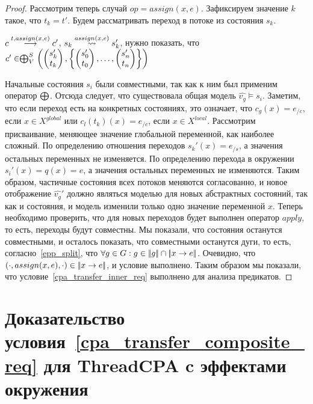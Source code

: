 \begin{proof}
Рассмотрим теперь случай $op = assign(x, e)$. Зафиксируем значение $k$ такое, что $t_k = t'$. Будем рассматривать переход в потоке из состояния $s_k$.

$c \stackrel{t, assign(x, e)}{\longrightarrow} c'$, $s_k \stackrel{assign(x, e)}{\leadsto} s_k'$, нужно показать, что 
$c' \in \mathrel{\bigoplus}^S_V
\left(
\begin{pmatrix}
s_k' \\
t_k 
\end{pmatrix},
\left\{
\begin{pmatrix}
s_0' \\
t_0 
\end{pmatrix},
\dots ,
\begin{pmatrix}
s_n' \\
t_n 
\end{pmatrix}
\right\}
\right)$

Начальные состояния $s_i$ были совместными, так как к ним был применим оператор $\mathrel{\bigoplus}$. 
Отсюда следует, что существовала общая модель $\hat{v_g} \models s_i$.
Заметим, что если переход есть на конкретных состояниях, это означает, что $c_g(x) = e_{/c}$, если $x \in X^{global}$ или $c_l(t_k)(x) = e_{/c}$, если $x \in X^{local}$.
Рассмотрим присваивание, меняющее значение глобальной переменной, как наиболее сложный.
По определению отношения переходов $s_k'(x) = e_{/s}$, а значения остальных переменных не изменяется.
По определению перехода в окружении $s_i'(x) = q(x) = e$, а значения остальных переменных не изменяются.
Таким образом, частичные состояния всех потоков меняются согласованно, и новое отображение $\hat{v_g}'$ должно являться моделью для новых абстрактных состояний, так как и состояния, и модель изменили только одно значение переменной $x$.
Теперь необходимо проверить, что для новых переходов будет выполнен оператор $apply$, то есть, переходы будут совместны.
Мы показали, что состояния останутся совместными, и осталось показать, что совместными останутся дуги, то есть, согласно~\ref{epp_split}, что $\forall g \in G: g \in \lvert \! \lvert g \rvert \! \rvert \cap \lvert \! \lvert x \to e \rvert \! \rvert$. 
Очевидно, что $(\cdot, assign(x, e), \cdot) \in \lvert \! \lvert x \to e \rvert \! \rvert$, и условие выполнено.
Таким образом мы показали, что условие~\ref{cpa_transfer_inner_req} выполнено для анализа предикатов.

\end{proof}


\section{Доказательство условия~\ref{cpa_transfer_composite_req} для ThreadCPA c эффектами окружения}
\label{sect_transfer_thread_env_proof}

